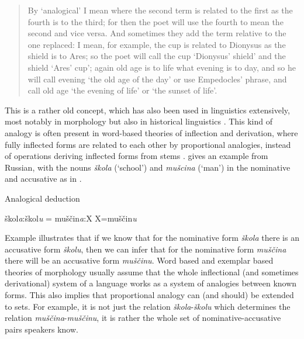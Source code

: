 \begin{quotation}
  By `analogical' I mean where the second term is related to the first as the fourth is to the third; for then the poet will use the fourth to mean the second and vice versa. And sometimes they add the term relative to the one replaced: I mean, for example, the cup is related to Dionysus as the shield is to Ares; so the poet will call the cup `Dionysus' shield' and the shield `Ares' cup'; again old age is to life what evening is to day, and so he will call evening `the old age of the day' or use Empedocles' phrase, and call old age `the evening of life' or `the sunset of life'. \autocite[Chapter III]{Russell.1989}
\end{quotation}


This is a rather old concept, which has also been used in linguistics extensively, most notably in morphology but also in historical linguistics \autocite{Paul.1995}. This kind of analogy is often present in word-based theories of inflection and derivation, where fully inflected forms are related to each other by proportional analogies, instead of operations deriving inflected forms from stems \autocites{Blevins.2006a, Blevins.2008, Blevins.2016a}. \textcite[543]{Blevins.2006a} gives an example from Russian, with the nouns \textit{škola} (`school') and \textit{mušcina} (`man') in the nominative and accusative as in .

\begin{exe}
    \ex \label{exe-analogy-prop} Analogical deduction
    \begin{xlist}
        \ex škol\textit{a}:škol\textit{u} = muščin\textit{a}:X
        \ex X=muščin\textit{u}
    \end{xlist}
\end{exe}

Example  illustrates that if we know that for the nominative form \textit{škola} there is an accusative form \textit{školu}, then we can infer that for the nominative form \textit{muščina} there will be an accusative form \textit{muščinu}. Word based and exemplar based theories of morphology usually assume that the whole inflectional (and sometimes derivational) system of a language works as a system of analogies between known forms. This also implies that proportional analogy can (and should) be extended to sets. For example, it is not just the relation \textit{škola}-\textit{školu} which determines the relation \textit{muščina}-\textit{muščinu}, it is rather the whole set of nominative-accusative pairs speakers know.

